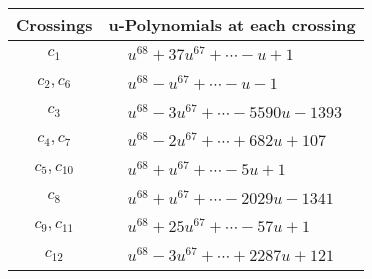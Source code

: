 \documentclass[1p]{elsarticle_modified}
\theoremstyle{definition}
\begin{document}
\begin{tabular}{m{50pt}|m{274pt}}
Crossings & \hspace{64pt}u-Polynomials at each crossing \\
\hline $$\begin{aligned}c_{1}\end{aligned}$$&$\begin{aligned}
&u^{68}+37 u^{67}+\cdots- u+1
\end{aligned}$\\
\hline $$\begin{aligned}c_{2},c_{6}\end{aligned}$$&$\begin{aligned}
&u^{68}- u^{67}+\cdots- u-1
\end{aligned}$\\
\hline $$\begin{aligned}c_{3}\end{aligned}$$&$\begin{aligned}
&u^{68}-3 u^{67}+\cdots-5590 u-1393
\end{aligned}$\\
\hline $$\begin{aligned}c_{4},c_{7}\end{aligned}$$&$\begin{aligned}
&u^{68}-2 u^{67}+\cdots+682 u+107
\end{aligned}$\\
\hline $$\begin{aligned}c_{5},c_{10}\end{aligned}$$&$\begin{aligned}
&u^{68}+u^{67}+\cdots-5 u+1
\end{aligned}$\\
\hline $$\begin{aligned}c_{8}\end{aligned}$$&$\begin{aligned}
&u^{68}+u^{67}+\cdots-2029 u-1341
\end{aligned}$\\
\hline $$\begin{aligned}c_{9},c_{11}\end{aligned}$$&$\begin{aligned}
&u^{68}+25 u^{67}+\cdots-57 u+1
\end{aligned}$\\
\hline $$\begin{aligned}c_{12}\end{aligned}$$&$\begin{aligned}
&u^{68}-3 u^{67}+\cdots+2287 u+121
\end{aligned}$\\
\hline
\end{tabular}\\~\\
\end{document}
